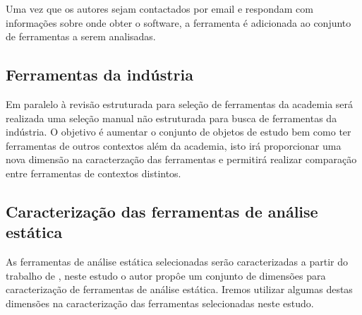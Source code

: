 Uma vez que os autores sejam contactados por email e respondam com informações
sobre onde obter o software, a ferramenta é adicionada ao conjunto de
ferramentas a serem analisadas.


\subsection{Ferramentas da indústria}

Em paralelo à revisão estruturada para seleção de ferramentas da academia será
realizada uma seleção manual não estruturada para busca de ferramentas da
indústria. O objetivo é aumentar o conjunto de objetos de estudo bem como ter
ferramentas de outros contextos além da academia, isto irá proporcionar uma
nova dimensão na caracterzação das ferramentas e permitirá realizar comparação
entre ferramentas de contextos distintos.

\subsection{Caracterização das ferramentas de análise estática}
\label{caracterizacao}

As ferramentas de análise estática selecionadas serão caracterizadas a partir
do trabalho de , neste estudo o autor propôe um
conjunto de dimensões para caracterização de ferramentas de análise estática.
Iremos utilizar algumas destas dimensões na caracterização das ferramentas
selecionadas neste estudo.

